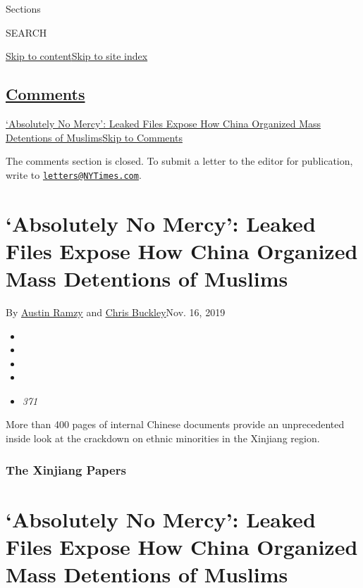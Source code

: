 Sections

SEARCH

\protect\hyperlink{site-content}{Skip to
content}\protect\hyperlink{site-index}{Skip to site index}

\hypertarget{comments}{%
\subsection{\texorpdfstring{\protect\hyperlink{commentsContainer}{Comments}}{Comments}}\label{comments}}

\href{}{`Absolutely No Mercy': Leaked Files Expose How China Organized
Mass Detentions of Muslims}\href{}{Skip to Comments}

The comments section is closed. To submit a letter to the editor for
publication, write to
\href{mailto:letters@NYTimes.com}{\nolinkurl{letters@NYTimes.com}}.

\hypertarget{absolutely-no-mercy-leaked-files-expose-how-china-organized-mass-detentions-of-muslims}{%
\section{`Absolutely No Mercy': Leaked Files Expose How China Organized
Mass Detentions of
Muslims}\label{absolutely-no-mercy-leaked-files-expose-how-china-organized-mass-detentions-of-muslims}}

By \href{https://www.nytimes3xbfgragh.onion/by/austin-ramzy}{Austin
Ramzy} and
\href{https://www.nytimes3xbfgragh.onion/by/chris-buckley}{Chris
Buckley}Nov. 16, 2019

\begin{itemize}
\item
\item
\item
\item
\item
  \emph{371}
\end{itemize}

More than 400 pages of internal Chinese documents provide an
unprecedented inside look at the crackdown on ethnic minorities in the
Xinjiang region.

\hypertarget{the-xinjiang-papers}{%
\subsubsection{The Xinjiang Papers}\label{the-xinjiang-papers}}

\hypertarget{absolutely-no-mercy-leaked-files-expose-how-china-organized-mass-detentions-of-muslims-1}{%
\section{`Absolutely No Mercy': Leaked Files Expose How China Organized
Mass Detentions of
Muslims}\label{absolutely-no-mercy-leaked-files-expose-how-china-organized-mass-detentions-of-muslims-1}}

